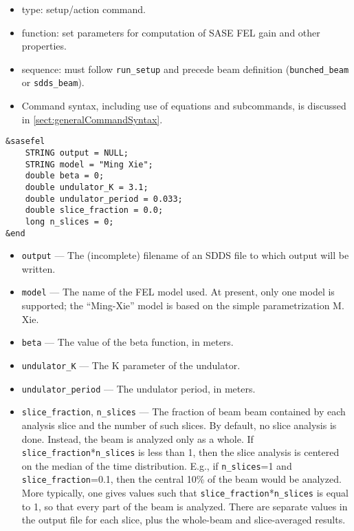 \documentclass[11pt]{article}
\begin{document}
\begin{itemize}
\item type: setup/action command.
\item function: set parameters for computation of SASE FEL gain and other properties.
\item sequence: must follow \verb|run_setup| and precede beam definition (\verb|bunched_beam| or \verb|sdds_beam|).
\item Command syntax, including use of equations and subcommands, is discussed in \ref{sect:generalCommandSyntax}.
\end{itemize}

\begin{verbatim}
&sasefel
    STRING output = NULL;
    STRING model = "Ming Xie";
    double beta = 0;
    double undulator_K = 3.1;
    double undulator_period = 0.033;
    double slice_fraction = 0.0;
    long n_slices = 0;
&end
\end{verbatim}

\begin{itemize}
\item \verb|output| --- The (incomplete) filename of an SDDS file to which output will be
written.
\item \verb|model| --- The name of the FEL model used.  At present, only one model is
supported; the ``Ming-Xie'' model is based on the simple parametrization M. Xie\cite{MingXie}.
\item \verb|beta| --- The value of the beta function, in meters.
\item \verb|undulator_K| --- The K parameter of the undulator.
\item \verb|undulator_period| --- The undulator period, in meters.
\item \verb|slice_fraction|, \verb|n_slices| --- The fraction of beam beam contained by each analysis slice
        and the number of such slices.
        By default, no slice analysis is done.  Instead, the beam is analyzed only as a whole.
        If \verb|slice_fraction|*\verb|n_slices| is less than 1, then the slice analysis
        is centered on the median of the time distribution.  E.g., if \verb|n_slices|=1 and
        \verb|slice_fraction|=0.1, then the central 10\% of the beam would be analyzed.
        More typically, one gives values such that \verb|slice_fraction|*\verb|n_slices| is
        equal to 1, so that every part of the beam is analyzed.  There are separate values in
        the output file for each slice, plus the whole-beam and slice-averaged results.
\end{itemize}
\end{document}
